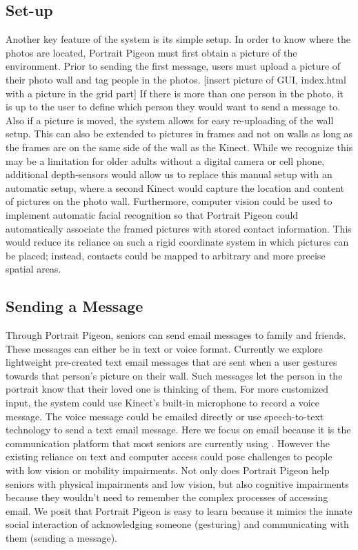 \documentclass{chi-ext}
\begin{document}
\subsection{Set-up}
Another key feature of the system is its simple setup. In order to know where the photos are located, Portrait Pigeon  must first obtain a picture of the environment. Prior to sending the first message, users must upload a picture of their photo wall and tag people in the photos. [insert picture of GUI, index.html with a picture in the grid part] If there is more than one person in the photo, it is up to the user to define which person they would want to send a message to. Also if a picture is moved, the system allows for easy re-uploading of the wall setup. This can also be extended to pictures in frames and not on walls as long as the frames are on the same side of the wall as the Kinect. While we recognize this may be a limitation for older adults without a digital camera or cell phone, additional depth-sensors would allow us to replace this manual setup with an automatic setup, where a second Kinect would capture the location and content of pictures on the photo wall. Furthermore, computer vision could be used to implement automatic facial recognition so that Portrait Pigeon could automatically associate the framed pictures with stored contact information. This would reduce its reliance on such a rigid coordinate system in which pictures can be placed; instead, contacts could be mapped to arbitrary and more precise spatial areas.

\subsection{Sending a Message}
Through Portrait Pigeon, seniors can send email messages to family and friends. These messages can either be in text or voice format. Currently we explore lightweight pre-created text email messages that are sent when a user gestures towards that person's picture on their wall. Such messages let the person in the portrait know that their loved one is thinking of them. For more customized input, the system could use Kinect's built-in microphone to record a voice message. The voice message could be emailed directly or use speech-to-text technology to send a text email message. Here we focus on email because it is the communication platform that most seniors are currently using \cite{Pew2012}. However the existing reliance on text and computer access could pose challenges to people with low vision or mobility impairments. Not only does Portrait Pigeon help seniors with physical impairments and low vision, but also cognitive impairments because they wouldn't need to remember the complex processes of accessing email. We posit that Portrait Pigeon is easy to learn because it mimics the innate social interaction of acknowledging someone (gesturing) and communicating with them (sending a message). 
\end{document}
